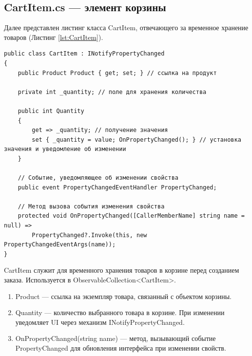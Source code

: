 \documentclass[12pt]{article}
\renewcommand{\texttt}[1]{{\small\ttfamily #1}}
\newenvironment{code}{\captionsetup{type=listing}}{}
\numberwithin{listing}{section}
\numberwithin{figure}{section}
\begin{document}
\subsection{\texttt{CartItem.cs} — элемент корзины}
Далее представлен листинг класса \texttt{CartItem}, отвечающего за временное хранение товаров (Листинг \ref{lst:CartItem}).
\begin{code}
	\begin{verbatim}
public class CartItem : INotifyPropertyChanged
{
    public Product Product { get; set; } // ссылка на продукт

    private int _quantity; // поле для хранения количества

    public int Quantity
    {
        get => _quantity; // получение значения
        set { _quantity = value; OnPropertyChanged(); } // установка значения и уведомление об изменении
    }

    // Событие, уведомляющее об изменении свойства
    public event PropertyChangedEventHandler PropertyChanged;

    // Метод вызова события изменения свойства
    protected void OnPropertyChanged([CallerMemberName] string name = null) =>
        PropertyChanged?.Invoke(this, new PropertyChangedEventArgs(name));
}
    \end{verbatim}
	\label{lst:CartItem}
\end{code}
\texttt{CartItem} служит для временного хранения товаров в корзине перед созданием заказа. Используется в \texttt{ObservableCollection<CartItem>}.

\begin{enumerate}
	\item \texttt{Product} — ссылка на экземпляр товара, связанный с объектом корзины.
	\item \texttt{Quantity} — количество выбранного товара в корзине. При изменении уведомляет UI через механизм \texttt{INotifyPropertyChanged}.
	\item \texttt{OnPropertyChanged(string name)} — метод, вызывающий событие \texttt{PropertyChanged} для обновления интерфейса при изменении свойств.
\end{enumerate}
\end{document}
